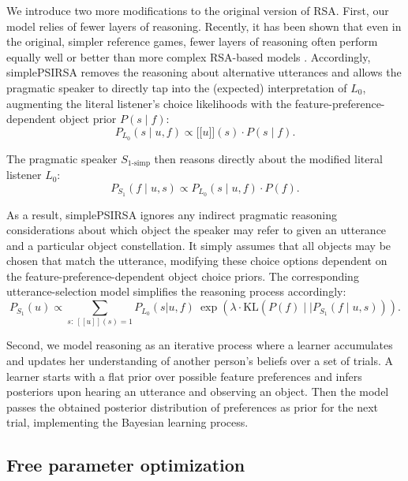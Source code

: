 \documentclass[10pt,a4paper]{article}
\newcommand{\sem}[1]{\mbox{$[\![$#1$]\!]$}}
\begin{document}
We introduce two more modifications to the original version of RSA. First, our model relies of fewer layers of reasoning. Recently, it has been shown that even in the original, simpler reference games, fewer layers of reasoning often perform equally well or better than more complex RSA-based models \cite{sikos2019}.
Accordingly, simplePSIRSA removes the reasoning about alternative utterances and allows the pragmatic speaker to directly tap into the (expected) interpretation of $L_0$, augmenting the literal listener's choice likelihoods with the feature-preference-dependent object prior $P(s\mid f)$:
\begin{equation}
P_{L_{0}}(s\mid u,f) \propto \sem{$u$}(s) \cdot P(s\mid f).
\end{equation}

The pragmatic speaker $S_{1\textrm{-simp}}$ then reasons directly about the modified literal listener $L_{0}$: 
\begin{equation}
P_{S_{1}}(f\mid u,s) \propto P_{L_{0}}(s\mid u,f) \cdot P(f).
\end{equation}

As a result, simplePSIRSA ignores any indirect pragmatic reasoning considerations about which object the speaker may refer to given an utterance and a particular object constellation.
It simply assumes that all objects may be chosen that match the utterance, modifying these choice options dependent on the feature-preference-dependent object choice priors. The corresponding utterance-selection model simplifies the reasoning process accordingly:
\begin{equation}
P_{S_1}(u) \propto \sum_{s:\  [\![u]\!](s)=1} P_{L_0}(s|u,f)\ \exp(\lambda \cdot \textrm{KL}(P(f)\mid\mid P_{S_{1}}(f\mid u,s))).
\label{eq:kldivlambdasimp}
\end{equation}

Second, we model reasoning as an iterative process where a learner accumulates and updates her understanding of another person's beliefs over a set of trials. A learner starts with a flat prior over possible feature preferences and infers posteriors upon hearing an utterance and observing an object. Then the model passes the obtained posterior distribution of preferences as prior for the next trial, implementing the Bayesian learning process.

\subsection{Free parameter optimization}
\end{document}
